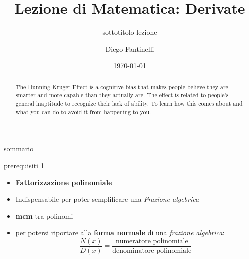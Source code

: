 \documentclass[aspectratio=169]{beamer}
\title{Lezione di Matematica: Derivate}
\subtitle{sottotitolo lezione}
\date{\today}
\author{Diego Fantinelli}
\institute{Matematica per il Liceo}
\begin{document}

\begin{frame}
	\titlepage
\end{frame}

\begin{frame}
    
    \begin{abstract}
        The Dunning Kruger Effect is a cognitive bias that makes people believe
        they are smarter and more capable than they actually are. The effect is
        related to people's general inaptitude to recognize their lack of
        ability. To learn how this comes about and what you can do to avoid it
        from happening to you.
    \end{abstract}
\end{frame}

\begin{frame}{sommario}
  \tableofcontents
\end{frame}








\begin{frame}{prerequisiti 1}
\begin{itemize}
\item
  \textbf{Fattorizzazione polinomiale}
\item
  Indispensabile per poter semplificare una \emph{Frazione algebrica}
\item
  \textbf{mcm} tra polinomi
\item
  per potersi riportare alla \textbf{forma normale} di una
  \emph{frazione algebrica}: \[\dfrac{N(x)}{D(x)} = \dfrac{\text{numeratore polinomiale}}{\text{denominatore polinomiale}}\]
\end{itemize}
\end{frame}
\end{document}
